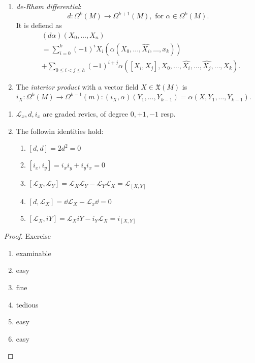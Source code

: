 \begin{definition}
\begin{enumerate}
	\item \emph{de-Rham differential}:
		\[
			d: \Omega^{k}(M) \to \Omega ^{k +1}(M), \text{ for } \alpha \in \Omega ^{k}(M)
		.\] 
		It is defiend as 
		\begin{align*}
			&(d \alpha)(X_0, \ldots, X_n) \\
			&= \sum_{i = 0}^{k} (-1)^{i} X_i(\alpha(X_0, \ldots, \hat{X_i}, \ldots, x_k)) \\ & + \sum_{0 \le i < j \le h}(-1)^{i + j} \alpha([X_i, X_j], X_0, \ldots, \hat{X_i}, \ldots, \hat{X_j}, \ldots , X_k)
		.\end{align*}
	\item The \emph{interior product} with a vector field $X \in \mathfrak{X} (M)$ is $i_X : \Omega^{k}(M) \to \Omega^{k-1}(m): (i_X, \alpha)(Y_1, \ldots, Y_{k-1}) = \alpha(X, Y_1, \ldots, Y_{k -1})$.
\end{enumerate}	
\end{definition}
\begin{proposition}
\begin{enumerate}
	\item $\mathcal{L}_x, d, i_x$ are graded revics, of degree  $0, +1, -1$ resp.
	\item The followin identities hold:
		 \begin{enumerate}
			 \item $[d, d] = 2d^2 = 0$
			 \item $[i_x, i_y]  = i_x i_y + i_y i_x = 0$
			 \item $[\mathcal{L} _X, \mathcal{L} _Y] = \mathcal{L} _X \mathcal{L} _Y - \mathcal{L}_Y \mathcal{L} _X = \mathcal{L}_{[X, Y]} $ 
			 \item $[d, \mathcal{L} _X] = \dd \mathcal{L} _X - \mathcal{L} _x \dd = 0$
			 \item $[\mathcal{L} _X, iY ] = \mathcal{L} _X i Y - i_Y \mathcal{L} _X = i_{[X,Y]}$
		\end{enumerate}
\end{enumerate}	
\end{proposition}
\begin{proof}
	Exercise 

	\begin{enumerate}
		\item examinable
		\item easy
		\item fine
		\item tedious
		\item easy
		\item easy
	\end{enumerate}
\end{proof}

